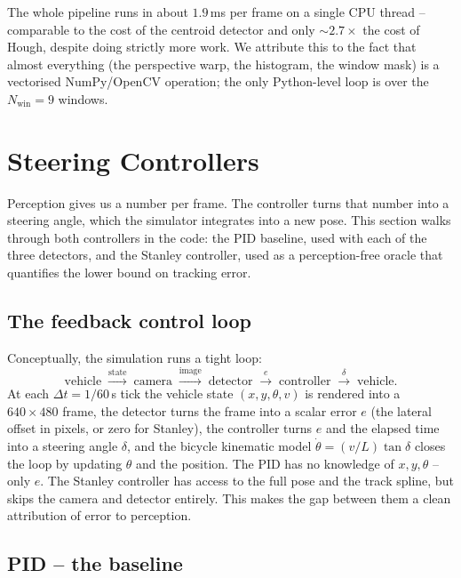 The whole pipeline runs in about $1.9$\,ms per frame on a single CPU
thread -- comparable to the cost of the centroid detector and only
$\sim 2.7\times$ the cost of Hough, despite doing strictly more work.
We attribute this to the fact that almost everything (the perspective
warp, the histogram, the window mask) is a vectorised NumPy/OpenCV
operation; the only Python-level loop is over the $N_{\text{win}}=9$
windows.

\section{Steering Controllers}
\label{sec:control}

Perception gives us a number per frame. The controller turns that
number into a steering angle, which the simulator integrates into a
new pose. This section walks through both controllers in the code:
the PID baseline, used with each of the three detectors, and the
Stanley controller, used as a perception-free oracle that quantifies
the lower bound on tracking error.

\subsection{The feedback control loop}

Conceptually, the simulation runs a tight loop:
\[
\text{vehicle}\;\xrightarrow{\text{state}}\;
\text{camera}\;\xrightarrow{\text{image}}\;
\text{detector}\;\xrightarrow{e}\;
\text{controller}\;\xrightarrow{\delta}\;
\text{vehicle}.
\]
At each $\Delta t = 1/60$\,s tick the vehicle state $(x,y,\theta,v)$
is rendered into a $640\times 480$ frame, the detector turns the
frame into a scalar error $e$ (the lateral offset in pixels, or zero
for Stanley), the controller turns $e$ and the elapsed time into a
steering angle $\delta$, and the bicycle kinematic model
$\dot\theta = (v/L)\tan\delta$ closes the loop by updating $\theta$
and the position. The PID has no knowledge of $x,y,\theta$ -- only
$e$. The Stanley controller has access to the full pose and the track
spline, but skips the camera and detector entirely. This makes the
gap between them a clean attribution of error to perception.

\subsection{PID -- the baseline}

